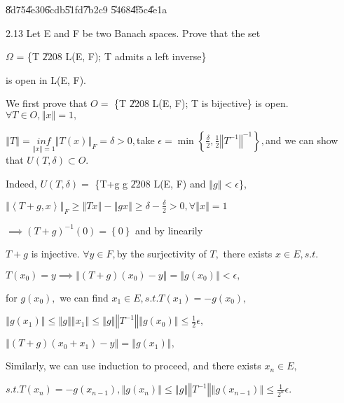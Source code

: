 \documentclass{article}
\begin{document}
\bigskip \U{8d75}\U{4e30}\qquad \U{6cdb}\U{51fd}\U{7b2c}9%
\U{5468}\U{4f5c}\U{4e1a}

2.13 Let E and F be two Banach spaces. Prove that the set

$\Omega $ = \{T \U{2208} L(E, F); T admits a left inverse\}

is open in L(E, F).

\bigskip We first prove that $O=$ \{T \U{2208} L(E, F); T is bijective\} is
open. $\forall T\in O,\left\Vert x\right\Vert =1,$

$\left\Vert T\right\Vert =\underset{\left\Vert x\right\Vert =1}{inf}%
\left\Vert T\left( x\right) \right\Vert _{F}=\delta >0,$take $\epsilon =\min
\left\{ \frac{\delta }{2},\frac{1}{2}\left\Vert T^{-1}\right\Vert
^{-1}\right\} ,$and we can show that $U\left( T,\delta \right) \subset O.$

Indeed, $U\left( T,\delta \right) =$ \{T+g \TEXTsymbol{\vert}g \U{2208} L(E,
F) and $\left\Vert g\right\Vert <\epsilon $\},

$\left\Vert \left\langle T+g,x\right\rangle \right\Vert _{F}\geq \left\Vert
Tx\right\Vert -\left\Vert gx\right\Vert \geq \delta -\frac{\delta }{2}%
>0,\forall \left\Vert x\right\Vert =1$

$\implies \left( T+g\right) ^{-1}\left( 0\right) =\left\{ 0\right\} $ and by
linearily 

$T+g$ is injective. $\forall y\in F,$by the surjectivity of $T,$ there
exists $x\in E,s.t.$

$T\left( x_{0}\right) =y\implies \left\Vert \left( T+g\right) \left(
x_{0}\right) -y\right\Vert =\left\Vert g\left( x_{0}\right) \right\Vert
<\epsilon ,$

for $g\left( x_{0}\right) ,$ we can find $x_{1}\in E,s.t.T\left(
x_{1}\right) =-g\left( x_{0}\right) ,$

$\left\Vert g\left( x_{1}\right) \right\Vert \leq \left\Vert g\right\Vert
\left\Vert x_{1}\right\Vert \leq \left\Vert g\right\Vert \left\Vert
T^{-1}\right\Vert \left\Vert g\left( x_{0}\right) \right\Vert \leq \frac{1}{2%
}\epsilon ,$

$\left\Vert \left( T+g\right) \left( x_{0}+x_{1}\right) -y\right\Vert
=\left\Vert g\left( x_{1}\right) \right\Vert ,$

Similarly, we can use induction to proceed, and there exists $x_{n}\in E,$

$s.t.T\left( x_{n}\right) =-g\left( x_{n-1}\right) ,\left\Vert g\left(
x_{n}\right) \right\Vert \leq \left\Vert g\right\Vert \left\Vert
T^{-1}\right\Vert \left\Vert g\left( x_{n-1}\right) \right\Vert \leq \frac{1%
}{2^{n}}\epsilon .$
\end{document}
